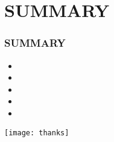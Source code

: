 \documentclass[aspectratio=169]{beamer}
\begin{document}
	\section{\Large SUMMARY}
	\begin{frame}[t]
		\frametitle{\LARGE SUMMARY}
		\begin{itemize}
			\setlength\itemsep{1em}
			\item \large
			\item \large
			\item \large
			\item \large
			\item \large
		\end{itemize}
	\end{frame}
	\begin{frame}
		\begin{center}
			\texttt{[image: thanks]}
		\end{center}
	\end{frame}
\end{document}
